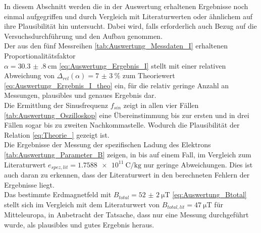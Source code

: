In diesem Abschnitt werden die in der Auswertung erhaltenen Ergebnisse 
noch einmal aufgegriffen und durch Vergleich mit Literaturwerten 
oder ähnlichem auf ihre Plausibilität hin untersucht. Dabei 
wird, falls erforderlich auch Bezug auf die Versuchsdurchführung 
und den Aufbau genommen. \\

Der aus den fünf Messreihen \cref{tab:Auswertung_Messdaten_I} erhaltenen Proportionalitätsfaktor\\  $ \alpha = \SI{30.3(8)}{\centi\meter}$ \cref{eq:Auswertung_Ergebnis_I} 
stellt mit einer relativen Abweichung von $\Delta_{rel}(\alpha) = \SI{7(3)}{\percent}$ zum 
Theoriewert \cref{eq:Auswertung_Ergebnis_I_theo} ein, für die relativ geringe Anzahl an Messungen, 
plausibles und genaues Ergebnis dar.\\

Die Ermittlung der Sinusfrequenz $f_{sin}$ zeigt in allen vier Fällen 
\cref{tab:Auswertung_Oszilloskop} eine Übereinstimmung bis zur ersten und
in drei Fällen sogar bis zu zweiten Nachkommastelle. Wodurch die
Plausibilität der Relation \cref{eq:Theorie_} gezeigt ist.\\

Die Ergebnisse der Messung der spezifischen Ladung des Elektrons 
\cref{tab:Auswertung_Parameter_B} zeigen, in bis auf einem Fall, 
im Vergleich zum Literaturwert
$e_{spez,lit} = \SI{1.7588e11}{\coulomb\per\kilo\g}$\cite{Mende09} nur geringe Abweichungen.
Dies ist auch daran zu erkennen, dass der Literaturwert in den berechneten 
Fehlern der Ergebnisse liegt.\\   

Das bestimmte Erdmagnetfeld mit $B_{total} =  \SI{52(2)}{\micro\tesla}$ 
\cref{eq:Auswertung_Btotal} stellt sich im Vergleich mit dem Literaturwert von
$B_{total,lit} = \SI{47}{\micro\tesla}$ \cite{GGU} für Mitteleuropa,
in Anbetracht der Tatsache, dass nur eine Messung durchgeführt wurde, als 
plausibles und gutes Ergebnis heraus. 

